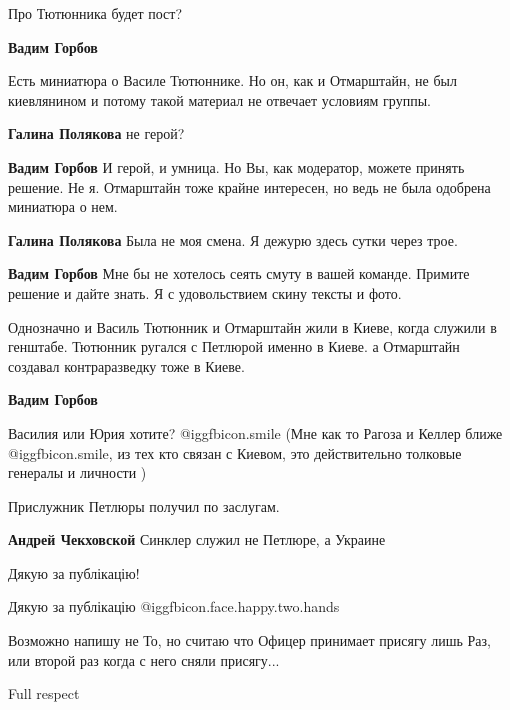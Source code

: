 \begin{itemize}
Про Тютюнника будет пост?

\begin{itemize} %
\textbf{Вадим Горбов} 

Есть миниатюра о Василе Тютюннике. Но он, как и Отмарштайн, не был киевлянином
и потому такой материал не отвечает условиям группы.

\begin{itemize} %
\textbf{Галина Полякова} не герой?

\textbf{Вадим Горбов} И герой, и умница. Но Вы, как модератор, можете принять решение. Не я. Отмарштайн тоже крайне интересен, но ведь не была одобрена миниатюра о нем.

\textbf{Галина Полякова} Была не моя смена. Я дежурю здесь сутки через трое.

\textbf{Вадим Горбов} Мне бы не хотелось сеять смуту в вашей команде. Примите решение и дайте знать. Я с удовольствием скину тексты и фото.


Однозначно и Василь Тютюнник и Отмарштайн жили в Киеве, когда служили в
генштабе. Тютюнник ругался с Петлюрой именно в Киеве. а Отмарштайн создавал
контраразведку тоже в Киеве.

\end{itemize} %

\textbf{Вадим Горбов} 

Василия или Юрия хотите?  @igg{fbicon.smile}  (Мне как то Рагоза и Келлер ближе
@igg{fbicon.smile}, из тех кто связан с Киевом, это действительно толковые
генералы и личности )

\end{itemize} %

Прислужник Петлюры получил по заслугам.

\textbf{Андрей Чекховской} Синклер служил не Петлюре, а Украине

Дякую за публікацію!

Дякую за публікацію @igg{fbicon.face.happy.two.hands} 

Возможно напишу не
То, но считаю что Офицер принимает присягу лишь Раз, или второй раз когда с него сняли присягу...

Full respect


\end{itemize}
